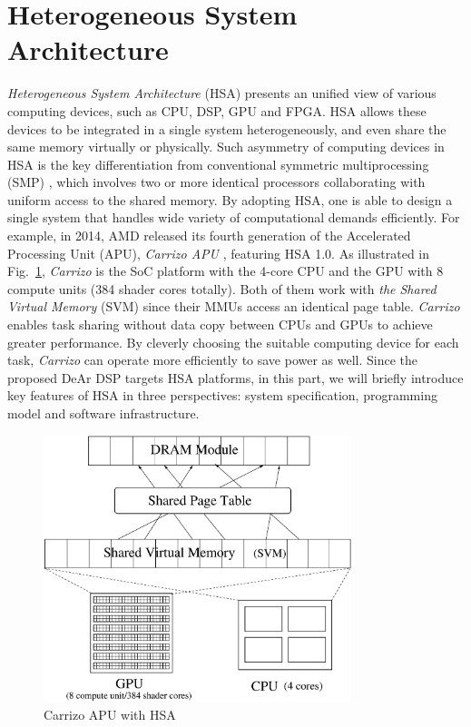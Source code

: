     \section{Heterogeneous System Architecture}
    \textit{Heterogeneous System Architecture} (HSA) presents an unified view of various computing devices, 
    such as CPU, DSP, GPU and FPGA.
    HSA allows these devices to be integrated in a single system heterogeneously, and even share the same memory virtually or physically.
    Such asymmetry of computing devices in HSA is the key differentiation from conventional symmetric multiprocessing (SMP) \cite{parallel},
    which involves two or more identical processors collaborating with uniform access to the shared memory.
    By adopting HSA, one is able to design a single system that handles wide variety of computational demands efficiently.
    For example, in 2014, AMD released its fourth generation of the Accelerated Processing Unit (APU), \textit{Carrizo APU} \cite{carrizo}, featuring HSA 1.0.
    As illustrated in Fig.~\ref{fig:carrizo}, \textit{Carrizo} is the SoC platform with the 4-core CPU and the GPU with 8 compute units (384 shader cores totally).
    Both of them work with \textit{the Shared Virtual Memory} (SVM) since their MMUs access an identical page table.
    \textit{Carrizo} enables task sharing without data copy between CPUs and GPUs to achieve greater performance.
    By cleverly choosing the suitable computing device for each task, 
    \textit{Carrizo} can operate more efficiently to save power as well.
    Since the proposed DeAr DSP targets HSA platforms, 
    in this part, we will briefly introduce key features of HSA in three perspectives: 
    system specification, programming model and software infrastructure.
        \vspace{\textfig}
        \begin{figure}[!ht] 
            \centering
            \includegraphics[width=0.8\textwidth]{./figs/carrizo.eps}
            \caption{Carrizo APU with HSA}
            \label{fig:carrizo}
        \end{figure}
